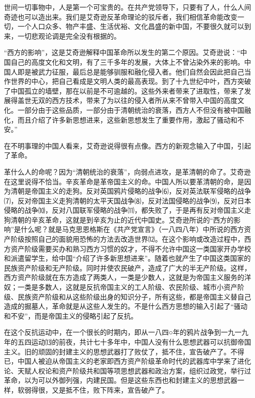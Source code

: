 \documentclass[UTF-8, a5paper, 12pt]{ctexart}
\begin{document}
世间一切事物中，人是第一个可宝贵的。在共产党领导下，只要有了人，什么人间奇迹也可以造出来。我们是艾奇逊反革命理论的驳斥者，我们相信革命能改变一切，一个人口众多、物产丰盛、生活优裕、文化昌盛的新中国，不要很久就可以到来，一切悲观论调是完全没有根据的。

“西方的影响”，这是艾奇逊解释中国革命所以发生的第二个原因。艾奇逊说：“中国自己的高度文化和文明，有了三千多年的发展，大体上不曾沾染外来的影响。中国人即是被武力征服，最后总是能够驯服和融化侵入者。他们自然会因此把自己当作世界的中心，把自己看成是文明人类的最高表现。到了十九世纪中叶，西方突破了中国孤立的墙壁，那在以前是不可逾越的。这些外来者带来了进取性，带来了发展得盖世无双的西方技术，带来了为以往的侵入者所从来不曾带入中国的高度文化。一部分由于这些品质，一部分由于清朝统治的衰落，西方人不但没有被中国融化，而且介绍了许多新思想进来，这些新思想发生了重要作用，激起了骚动和不安。”

在不明事理的中国人看来，艾奇逊说得很有点像。西方的新观念输入了中国，引起了革命。

革什么人的命呢？因为“清朝统治的衰落”，向弱点进攻，是革清朝的命了。艾奇逊在这里说得不恰当。辛亥革命是革帝国主义的命。中国人所以要革清朝的命，是因为清朝是帝国主义的走狗。反对英国鸦片侵略的战争⑹，反对英法联军侵略的战争⑺，反对帝国主义走狗清朝的太平天国战争⑻，反对法国侵略的战争⑼，反对日本侵略的战争⑽，反对八国联军侵略的战争⑾，都失败了，于是再有反对帝国主义走狗清朝的辛亥革命，这就是到辛亥为止的近代中国史。艾奇逊所说的“西方的影响”是什么呢？就是马克思恩格斯在《共产党宣言》（一八四八年）中所说的西方资产阶级按照自己的面貌用恐怖的方法去改造世界⑿。在这个影响或改造过程中，西方资产阶级需要买办和熟习西方习惯的奴才，不得不允许中国这一类国家开办学校和派遣留学生，给中国“介绍了许多新思想进来”。随着也就产生了中国这类国家的民族资产阶级和无产阶级。同时并使农民破产，造成了广大的半无产阶级。这样，西方资产阶级就在东方造成了两类人，一类是少数人，这就是为帝国主义服务的洋奴；一类是多数人，这就是反抗帝国主义的工人阶级、农民阶级、城市小资产阶级、民族资产阶级和从这些阶级出身的知识分子，所有这些，都是帝国主义替自己造成的掘墓人，革命就是从这些人发生的。不是什么西方思想的输入引起了“骚动和不安”，而是帝国主义的侵略引起了反抗。

在这个反抗运动中，在一个很长的时期内，即从一八四○年的鸦片战争到一九一九年的五四运动⒀的前夜，共计七十多年中，中国人没有什么思想武器可以抗御帝国主义。旧的顽固的封建主义的思想武器打了败仗了，抵不住，宣告破产了。不得已，中国人被迫从帝国主义的老家即西方资产阶级革命时代的武器库中学来了进化论、天赋人权论和资产阶级共和国等项思想武器和政治方案，组织过政党，举行过革命，以为可以外御列强，内建民国。但是这些东西也和封建主义的思想武器一样，软弱得很，又是抵不住，败下阵来，宣告破产了。
\end{document}
